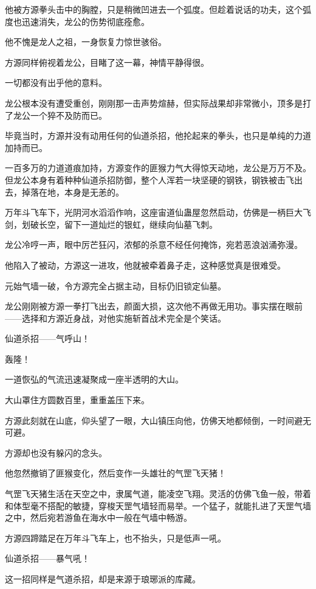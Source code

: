 \begin{this_body}
他被方源拳头击中的胸膛，只是稍微凹进去一个弧度。但趁着说话的功夫，这个弧度也迅速消失，龙公的伤势彻底痊愈。

他不愧是龙人之祖，一身恢复力惊世骇俗。

方源同样俯视着龙公，目睹了这一幕，神情平静得很。

一切都没有出乎他的意料。

龙公根本没有遭受重创，刚刚那一击声势煊赫，但实际战果却非常微小，顶多是打了龙公一个猝不及防而已。

毕竟当时，方源并没有动用任何的仙道杀招，他抡起来的拳头，也只是单纯的力道加持而已。

一百多万的力道道痕加持，方源变作的匪猴力气大得惊天动地，龙公是万万不及。但龙公本身有着种种仙道杀招防御，整个人浑若一块坚硬的钢铁，钢铁被击飞出去，掉落在地，本身是无恙的。

万年斗飞车下，光阴河水滔滔作响，这座宙道仙蛊屋忽然启动，仿佛是一柄巨大飞剑，划破长空，留下一道灿烂的银虹，继续向仙墓飞刺。

龙公冷哼一声，眼中厉芒狂闪，浓郁的杀意不经任何掩饰，宛若恶浪汹涌弥漫。

他陷入了被动，方源这一进攻，他就被牵着鼻子走，这种感觉真是很难受。

元始气墙一破，令方源完全占据主动，目标仍旧锁定仙墓。

龙公刚刚被方源一拳打飞出去，颜面大损，这次他不再做无用功。事实摆在眼前——选择和方源近身战，对他实施斩首战术完全是个笑话。

仙道杀招——气呼山！

轰隆！

一道恢弘的气流迅速凝聚成一座半透明的大山。

大山罩住方圆数百里，重重盖压下来。

方源此刻就在山底，仰头望了一眼，大山镇压向他，仿佛天地都倾倒，一时间避无可避。

方源却也没有躲闪的念头。

他忽然撤销了匪猴变化，然后变作一头雄壮的气罡飞天猪！

气罡飞天猪生活在天空之中，隶属气道，能凌空飞翔。灵活的仿佛飞鱼一般，带着和体型毫不搭配的敏捷，穿梭天罡气墙轻而易举。一个猛子，就能扎进了天罡气墙之中，然后宛若游鱼在海水中一般在气墙中畅游。

方源四蹄踏足在万年斗飞车上，也不抬头，只是低声一吼。

仙道杀招——暴气吼！

这一招同样是气道杀招，却是来源于琅琊派的库藏。


\end{this_body}
